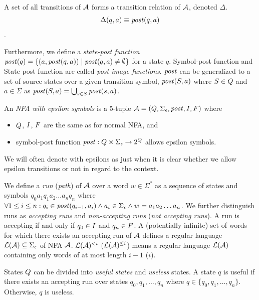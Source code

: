 A set of all transitions of $\mathcal{A}$ forms a transition relation of $\mathcal{A}$, denoted $\Delta$.$$\Delta(q, a) \equiv \mathit{post}(q, a)$$.

Furthermore, we define a \emph{state-post function} $\mathit{post}(q) = \{ (a, \mathit{post}(q, a)) \mid \mathit{post}(q, a) \neq \emptyset \}$ for a state $q$.
Symbol-post function and State-post function are called \emph{post-image functions}.
$\mathit{post}$ can be generalized to a set of source states over a given transition symbol, $\mathit{post}(S, a)$ where $S \in Q$ and $a \in \Sigma$ as $\mathit{post}(S, a) = \bigcup_{s \in S} \mathit{post}(s, a)$.


\begin{definition} \hfill \newline
An \emph{NFA with epsilon symbols} is a 5-tuple $\mathcal{A} = (Q, \Sigma_\epsilon, \mathit{post}, I, F)$ where
\begin{itemize}
    \item $Q$, $I$, $F$ are the same as for normal NFA, and
    \item symbol-post function $\mathit{post}: Q \times \Sigma_\epsilon \rightarrow 2^{Q}$ allows epsilon symbols.
\end{itemize}
We will often denote \nfa with epsilons as just \nfa when it is clear whether we allow epsilon transitions or not in regard to the context.
\end{definition}

We define a \emph{run} (\emph{path}) of $\mathcal{A}$ over a word $w \in \Sigma^*$ as a sequence of states and symbols $q_0a_1q_1a_2\ldots a_nq_n$ where $\forall 1 \leq i \leq n: q_i \in \mathit{post}(q_{i-1}, a_i) \land a_i \in \Sigma_\epsilon \land w = a_1a_2\ldots a_n$.
We further distinguish runs as \emph{accepting runs} and \emph{non-accepting runs} (\emph{not accepting runs}).
A run is accepting if and only if $q_0 \in I$ and $q_n \in F$.
A (potentially infinite) set of words for which there exists an accepting run of $\mathcal{A}$ defines a regular language $\mathcal{L}(\mathcal{A}) \subseteq \Sigma_\epsilon$ of NFA $\mathcal{A}$. $\mathcal{L}(\mathcal{A})^{<i}$ ($\mathcal{L}(\mathcal{A})^{\leq i}$) means a regular language $\mathcal{L}(\mathcal{A})$ containing only words of at most length $i - 1$ ($i$).

States $Q$ can be divided into \emph{useful states} and \emph{useless} states.
A state $q$ is useful if there exists an accepting run over states $q_0, q_1, \ldots, q_n$ where $q \in \{ q_0, q_1, \ldots, q_n \}$.
Otherwise, $q$ is useless.

